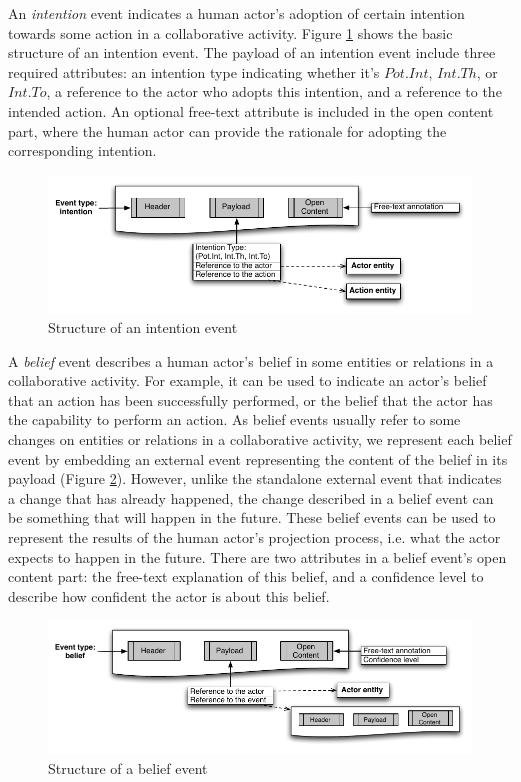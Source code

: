 An \emph{intention} event indicates a human actor's adoption of certain intention towards some action in a collaborative activity. Figure \ref{fig:intention_event} shows the basic structure of an intention event. The payload of an intention event include three required attributes: an intention type indicating whether it's $Pot.Int$, $Int.Th$, or $Int.To$, a reference to the actor who adopts this intention, and a reference to the intended action. An optional free-text attribute is included in the open content part, where the human actor can provide the rationale for adopting the corresponding intention.
\begin{figure}[htbp] %
	\centering
	\includegraphics{intention_event.pdf} 
	\caption{Structure of an intention event}
	\label{fig:intention_event}
\end{figure}

A \emph{belief} event describes a human actor's belief in some entities or relations in a collaborative activity. For example, it can be used to indicate an actor's belief that an action has been successfully performed, or the belief that the actor has the capability to perform an action. As belief events usually refer to some changes on entities or relations in a collaborative activity, we represent each belief event by embedding an external event representing the content of the belief in its payload (Figure \ref{fig:belief_event}). However, unlike the standalone external event that indicates a change that has already happened, the change described in a belief event can be something that will happen in the future. These belief events can be used to represent the results of the human actor's projection process, i.e. what the actor expects to happen in the future. There are two attributes in a belief event's open content part: the free-text explanation of this belief, and a confidence level to describe how confident the actor is about this belief.
\begin{figure}[htbp] %
	\centering
	\includegraphics{belief_event.pdf} 
	\caption{Structure of a belief event}
	\label{fig:belief_event}
\end{figure}

